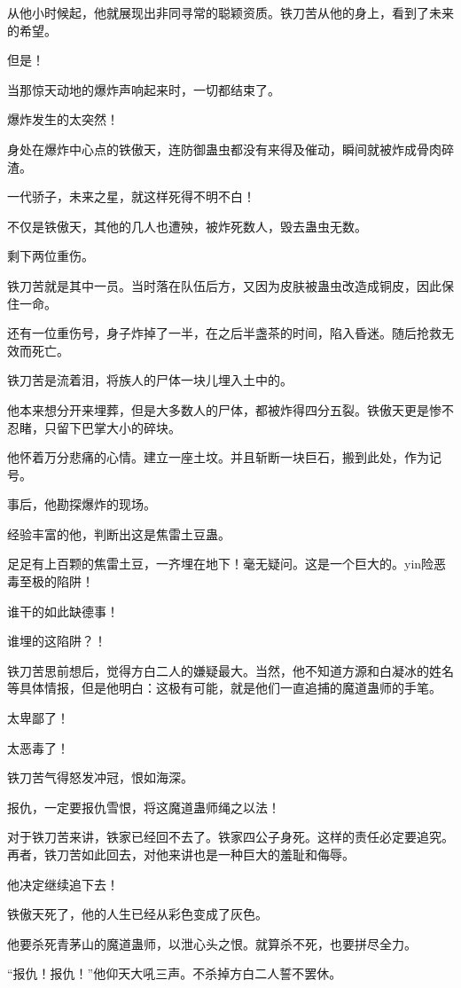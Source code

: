 \begin{this_body}
从他小时候起，他就展现出非同寻常的聪颖资质。铁刀苦从他的身上，看到了未来的希望。

但是！

当那惊天动地的爆炸声响起来时，一切都结束了。

爆炸发生的太突然！

身处在爆炸中心点的铁傲天，连防御蛊虫都没有来得及催动，瞬间就被炸成骨肉碎渣。

一代骄子，未来之星，就这样死得不明不白！

不仅是铁傲天，其他的几人也遭殃，被炸死数人，毁去蛊虫无数。

剩下两位重伤。

铁刀苦就是其中一员。当时落在队伍后方，又因为皮肤被蛊虫改造成铜皮，因此保住一命。

还有一位重伤号，身子炸掉了一半，在之后半盏茶的时间，陷入昏迷。随后抢救无效而死亡。

铁刀苦是流着泪，将族人的尸体一块儿埋入土中的。

他本来想分开来埋葬，但是大多数人的尸体，都被炸得四分五裂。铁傲天更是惨不忍睹，只留下巴掌大小的碎块。

他怀着万分悲痛的心情。建立一座土坟。并且斩断一块巨石，搬到此处，作为记号。

事后，他勘探爆炸的现场。

经验丰富的他，判断出这是焦雷土豆蛊。

足足有上百颗的焦雷土豆，一齐埋在地下！毫无疑问。这是一个巨大的。yin险恶毒至极的陷阱！

谁干的如此缺德事！

谁埋的这陷阱？！

铁刀苦思前想后，觉得方白二人的嫌疑最大。当然，他不知道方源和白凝冰的姓名等具体情报，但是他明白：这极有可能，就是他们一直追捕的魔道蛊师的手笔。

太卑鄙了！

太恶毒了！

铁刀苦气得怒发冲冠，恨如海深。

报仇，一定要报仇雪恨，将这魔道蛊师绳之以法！

对于铁刀苦来讲，铁家已经回不去了。铁家四公子身死。这样的责任必定要追究。再者，铁刀苦如此回去，对他来讲也是一种巨大的羞耻和侮辱。

他决定继续追下去！

铁傲天死了，他的人生已经从彩色变成了灰色。

他要杀死青茅山的魔道蛊师，以泄心头之恨。就算杀不死，也要拼尽全力。

“报仇！报仇！”他仰天大吼三声。不杀掉方白二人誓不罢休。


\end{this_body}
